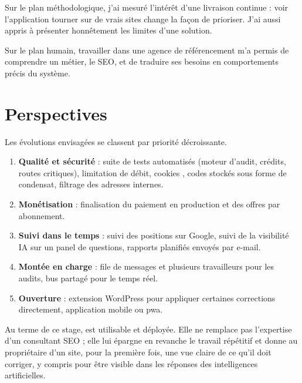 Sur le plan méthodologique, j'ai mesuré l'intérêt d'une livraison continue : voir l'application tourner sur de vrais sites change la façon de prioriser. J'ai aussi appris à présenter honnêtement les limites d'une solution.

Sur le plan humain, travailler dans une agence de référencement m'a permis de comprendre un métier, le SEO, et de traduire ses besoins en comportements précis du système.

\section*{Perspectives}
Les évolutions envisagées se classent par priorité décroissante.

\begin{enumerate}
  \item \textbf{Qualité et sécurité} : suite de tests automatisés (moteur d'audit, crédits, routes critiques), limitation de débit, cookies , codes stockés sous forme de condensat, filtrage des adresses internes.
  \item \textbf{Monétisation} : finalisation du paiement en production et des offres par abonnement.
  \item \textbf{Suivi dans le temps} : suivi des positions sur Google, suivi de la visibilité IA sur un panel de questions, rapports planifiés envoyés par e-mail.
  \item \textbf{Montée en charge} : file de messages et plusieurs travailleurs pour les audits, bus partagé pour le temps réel.
  \item \textbf{Ouverture} : extension WordPress pour appliquer certaines corrections directement, application mobile ou \gls{pwa}.
\end{enumerate}

Au terme de ce stage, \xapp{} est utilisable et déployée. Elle ne remplace pas l'expertise d'un consultant SEO ; elle lui épargne en revanche le travail répétitif et donne au propriétaire d'un site, pour la première fois, une vue claire de ce qu'il doit corriger, y compris pour être visible dans les réponses des intelligences artificielles.
